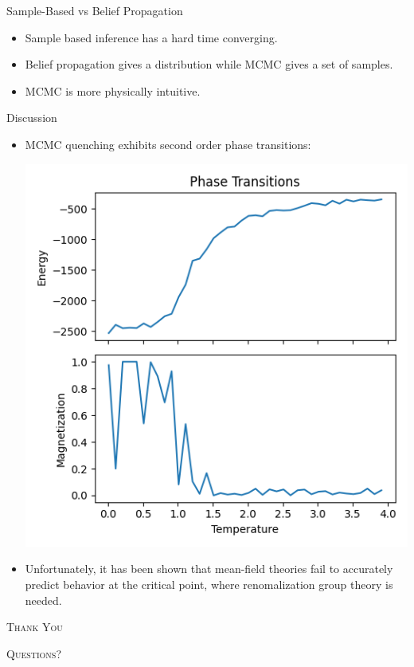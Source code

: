 \documentclass{minesbeamer}
\begin{document}
\begin{frame}{Sample-Based vs Belief Propagation}
    \begin{itemize}
        \item 
        Sample based inference has a hard time converging.
        \item 
        Belief propagation gives a distribution while MCMC gives a set of 
        samples. 
        \item MCMC is more physically intuitive. 
    \end{itemize}
\end{frame}

\begin{frame}{Discussion}
    \begin{itemize}
        \item MCMC quenching exhibits second order phase transitions:
        \centering

        \includegraphics[height=0.6\textheight]{mcmc_phase.png}
        \item 
        Unfortunately, it has been shown that mean-field theories fail to 
        accurately predict behavior at the critical point, where
        renomalization group theory is needed. 
    \end{itemize}
\end{frame}
\begin{frame}[standout]
    \Huge\textsc{Thank You}
    
    \vfill
    
    \LARGE\textsc{Questions?}
\end{frame}
\end{document}
